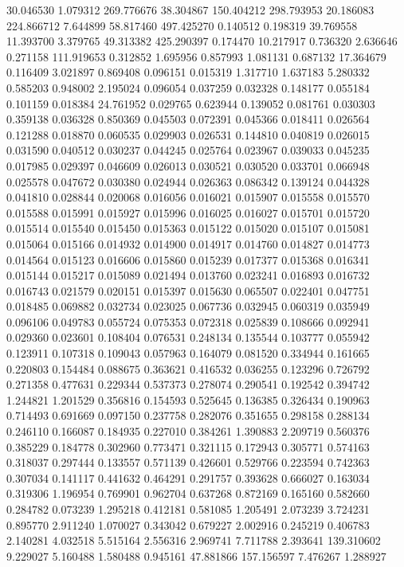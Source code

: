 30.046530
1.079312
269.776676
38.304867
150.404212
298.793953
20.186083
224.866712
7.644899
58.817460
497.425270
0.140512
0.198319
39.769558
11.393700
3.379765
49.313382
425.290397
0.174470
10.217917
0.736320
2.636646
0.271158
111.919653
0.312852
1.695956
0.857993
1.081131
0.687132
17.364679
0.116409
3.021897
0.869408
0.096151
0.015319
1.317710
1.637183
5.280332
0.585203
0.948002
2.195024
0.096054
0.037259
0.032328
0.148177
0.055184
0.101159
0.018384
24.761952
0.029765
0.623944
0.139052
0.081761
0.030303
0.359138
0.036328
0.850369
0.045503
0.072391
0.045366
0.018411
0.026564
0.121288
0.018870
0.060535
0.029903
0.026531
0.144810
0.040819
0.026015
0.031590
0.040512
0.030237
0.044245
0.025764
0.023967
0.039033
0.045235
0.017985
0.029397
0.046609
0.026013
0.030521
0.030520
0.033701
0.066948
0.025578
0.047672
0.030380
0.024944
0.026363
0.086342
0.139124
0.044328
0.041810
0.028844
0.020068
0.016056
0.016021
0.015907
0.015558
0.015570
0.015588
0.015991
0.015927
0.015996
0.016025
0.016027
0.015701
0.015720
0.015514
0.015540
0.015450
0.015363
0.015122
0.015020
0.015107
0.015081
0.015064
0.015166
0.014932
0.014900
0.014917
0.014760
0.014827
0.014773
0.014564
0.015123
0.016606
0.015860
0.015239
0.017377
0.015368
0.016341
0.015144
0.015217
0.015089
0.021494
0.013760
0.023241
0.016893
0.016732
0.016743
0.021579
0.020151
0.015397
0.015630
0.065507
0.022401
0.047751
0.018485
0.069882
0.032734
0.023025
0.067736
0.032945
0.060319
0.035949
0.096106
0.049783
0.055724
0.075353
0.072318
0.025839
0.108666
0.092941
0.029360
0.023601
0.108404
0.076531
0.248134
0.135544
0.103777
0.055942
0.123911
0.107318
0.109043
0.057963
0.164079
0.081520
0.334944
0.161665
0.220803
0.154484
0.088675
0.363621
0.416532
0.036255
0.123296
0.726792
0.271358
0.477631
0.229344
0.537373
0.278074
0.290541
0.192542
0.394742
1.244821
1.201529
0.356816
0.154593
0.525645
0.136385
0.326434
0.190963
0.714493
0.691669
0.097150
0.237758
0.282076
0.351655
0.298158
0.288134
0.246110
0.166087
0.184935
0.227010
0.384261
1.390883
2.209719
0.560376
0.385229
0.184778
0.302960
0.773471
0.321115
0.172943
0.305771
0.574163
0.318037
0.297444
0.133557
0.571139
0.426601
0.529766
0.223594
0.742363
0.307034
0.141117
0.441632
0.464291
0.291757
0.393628
0.666027
0.163034
0.319306
1.196954
0.769901
0.962704
0.637268
0.872169
0.165160
0.582660
0.284782
0.073239
1.295218
0.412181
0.581085
1.205491
2.073239
3.724231
0.895770
2.911240
1.070027
0.343042
0.679227
2.002916
0.245219
0.406783
2.140281
4.032518
5.515164
2.556316
2.969741
7.711788
2.393641
139.310602
9.229027
5.160488
1.580488
0.945161
47.881866
157.156597
7.476267
1.288927
